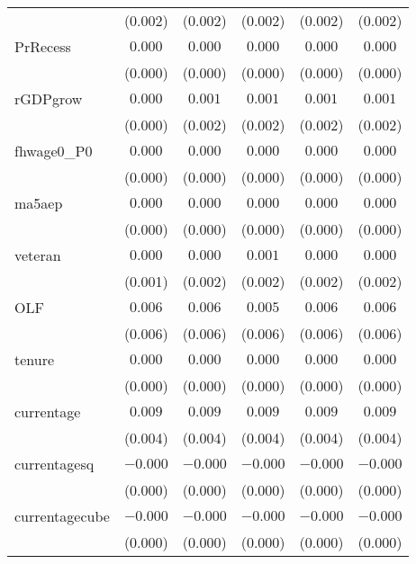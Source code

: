 \documentclass[12pt]{article}
\begin{document}
\begin{table}[ht]
\begin{tabular}{lccccc}
                    & (0.002)   & (0.002)     & (0.002)   & (0.002)    & (0.002)     \\
PrRecess            & $0.000$   & $0.000$     & $0.000$   & $0.000$    & $0.000$     \\
                    & (0.000)   & (0.000)     & (0.000)   & (0.000)    & (0.000)     \\
rGDPgrow            & $0.000$   & $0.001$     & $0.001$   & $0.001$    & $0.001$     \\
                    & (0.000)   & (0.002)     & (0.002)   & (0.002)    & (0.002)     \\
fhwage0\_P0         & $0.000$   & $0.000$     & $0.000$   & $0.000$    & $0.000$     \\
                    & (0.000)   & (0.000)     & (0.000)   & (0.000)    & (0.000)     \\
ma5aep              & $0.000$   & $0.000$     & $0.000$   & $0.000$    & $0.000$     \\
                    & (0.000)   & (0.000)     & (0.000)   & (0.000)    & (0.000)     \\
veteran             & $0.000$   & $0.000$     & $0.001$   & $0.000$    & $0.000$     \\
                    & (0.001)   & (0.002)     & (0.002)   & (0.002)    & (0.002)     \\
OLF                 & $0.006$   & $0.006$     & $0.005$   & $0.006$    & $0.006$     \\
                    & (0.006)   & (0.006)     & (0.006)   & (0.006)    & (0.006)     \\
tenure              & $0.000$   & $0.000$     & $0.000$   & $0.000$    & $0.000$     \\
                    & (0.000)   & (0.000)     & (0.000)   & (0.000)    & (0.000)     \\
currentage          & $0.009$   & $0.009$     & $0.009$   & $0.009$    & $0.009$     \\
                    & (0.004)   & (0.004)     & (0.004)   & (0.004)    & (0.004)     \\
currentagesq        & $-0.000$  & $-0.000$    & $-0.000$  & $-0.000$   & $-0.000$    \\
                    & (0.000)   & (0.000)     & (0.000)   & (0.000)    & (0.000)     \\
currentagecube      & $-0.000$  & $-0.000$    & $-0.000$  & $-0.000$   & $-0.000$    \\
                    & (0.000)   & (0.000)     & (0.000)   & (0.000)    & (0.000)     \\


\end{tabular}
\end{table}
\end{document}
